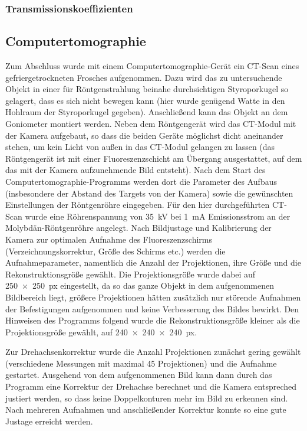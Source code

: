 \documentclass[11pt, a4paper]{article}
\numberwithin{equation}{section}
\begin{document}
\subsubsection{Transmissionskoeffizienten}

\subsection{Computertomographie}

Zum Abschluss wurde mit einem Computertomographie-Gerät ein CT-Scan eines gefriergetrockneten Frosches aufgenommen.
Dazu wird das zu untersuchende Objekt in einer für Röntgenstrahlung beinahe durchsichtigen Styroporkugel so gelagert, dass es sich nicht bewegen kann (hier wurde genügend Watte in den Hohlraum der Styroporkugel gegeben).
Anschließend kann das Objekt an dem Goniometer montiert werden.
Neben dem Röntgengerät wird das CT-Modul mit der Kamera aufgebaut, so dass die beiden Geräte möglichst dicht aneinander stehen, um kein Licht von außen in das CT-Modul gelangen zu lassen (das Röntgengerät ist mit einer Fluoreszenzschicht am Übergang ausgestattet, auf dem das mit der Kamera aufzunehmende Bild entsteht).
Nach dem Start des Computertomographie-Programms werden dort die Parameter des Aufbaus (insbesondere der Abstand des Targets von der Kamera) sowie die gewünschten Einstellungen der Röntgenröhre eingegeben.
Für den hier durchgeführten CT-Scan wurde eine Röhrenspannung von \SI{35}{\kilo\volt} bei \SI{1}{\milli\ampere} Emissionsstrom an der Molybdän-Röntgenröhre angelegt.
Nach Bildjustage und Kalibrierung der Kamera zur optimalen Aufnahme des Fluoreszenzschirms (Verzeichnungskorrektur, Größe des Schirms etc.) werden die Aufnahmeparameter, namentlich die Anzahl der Projektionen, ihre Größe und die Rekonstruktionsgröße gewählt.
Die Projektionsgröße wurde dabei auf \SI{250x250}{px} eingestellt, da so das ganze Objekt in dem aufgenommenen Bildbereich liegt, größere Projektionen hätten zusätzlich nur störende Aufnahmen der Befestigungen aufgenommen und keine Verbesserung des Bildes bewirkt.
Den Hinweisen des Programms folgend wurde die Rekonstruktionsgröße kleiner als die Projektionsgröße gewählt, auf \SI{240x240x240}{px}.

Zur Drehachsenkorrektur wurde die Anzahl Projektionen zunächst gering gewählt (verschiedene Messungen mit maximal \num{45} Projektionen) und die Aufnahme gestartet.
Ausgehend von dem aufgenommenen Bild kann dann durch das Programm eine Korrektur der Drehachse berechnet und die Kamera entspreched justiert werden, so dass keine Doppelkonturen mehr im Bild zu erkennen sind.
Nach mehreren Aufnahmen und anschließender Korrektur konnte so eine gute Justage erreicht werden.
\end{document}
